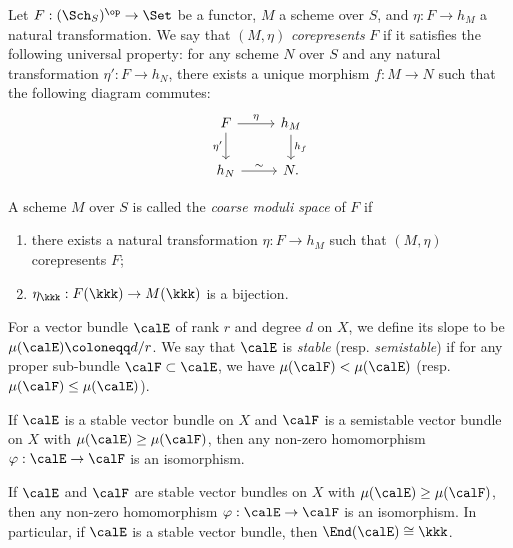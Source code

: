     Let \(F : (\Sch_S)^{\op} \to \Set\) be a functor, \(M\) a scheme over \(S\), and \(\eta : F \to h_M\) a natural transformation.
    We say that \((M, \eta)\) \emph{corepresents} \(F\) if it satisfies the following universal property: 
    for any scheme \(N\) over \(S\) and any natural transformation \(\eta' : F \to h_N\), there exists a unique morphism \(f : M \to N\) such that the following diagram commutes:
    \[
    \begin{tikzcd}
        F \arrow[r, "\eta"] \arrow[d, "\eta'"'] & h_M \arrow[d, "h_f"] \\
        h_N \arrow[r, "\sim"] & N.
    \end{tikzcd}
    \]

    \begin{definition}\label{def:coarse_moduli_space}
        A scheme \(M\) over \(S\) is called the \emph{coarse moduli space} of \(F\) if 
        \begin{enumerate}
            \item there exists a natural transformation \(\eta : F \to h_M\) such that \((M, \eta)\) corepresents \(F\);
            \item \(\eta_\kkk : F(\kkk) \to M(\kkk)\) is a bijection.
        \end{enumerate}
    \end{definition}

    For a vector bundle \(\calE\) of rank \(r\) and degree \(d\) on \(X\), we define its slope to be \(\mu(\calE) \coloneqq d/r\).
    We say that \(\calE\) is \emph{stable} (resp. \emph{semistable}) if for any proper sub-bundle \(\calF \subset \calE\), we have \(\mu(\calF) < \mu(\calE)\) (resp. \(\mu(\calF) \leq \mu(\calE)\)).

    \begin{proposition}\label{prop:homomorphism_between_semistable_and_stable_bundles}
        If \(\calE\) is a stable vector bundle on \(X\) and \(\calF\) is a semistable vector bundle on \(X\) with \(\mu(\calE) \geq \mu(\calF)\), then any non-zero homomorphism \(\varphi : \calE \to \calF\) is an isomorphism.


        If \(\calE\) and \(\calF\) are stable vector bundles on \(X\) with \(\mu(\calE) \geq \mu(\calF)\), then any non-zero homomorphism \(\varphi : \calE \to \calF\) is an isomorphism.
        In particular, if \(\calE\) is a stable vector bundle, then \(\End(\calE) \cong \kkk\).
    \end{proposition}

